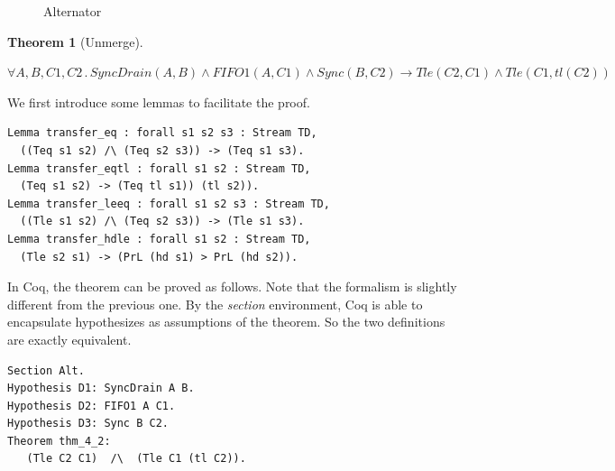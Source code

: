 \documentclass[preprint,3p]{elsarticle}
\newtheorem{theorem}{Theorem}[section]
\begin{document}
\begin{figure}
\vspace{0.5cm}
\centering
{}
\caption{Alternator}
\label{fig:alternator}
\end{figure}

\begin{theorem}[Unmerge]\label{the:alternator}

$\forall A,B,C1,C2\,.\,
SyncDrain(A,B)\land FIFO1(A,C1)\land Sync(B,C2)  \rightarrow Tle(C2,C1) \wedge Tle(C1, tl(C2))
$
\end{theorem}

We first introduce some lemmas to facilitate the proof.
\begin{lstlisting}[language=coq]
Lemma transfer_eq : forall s1 s2 s3 : Stream TD,
  ((Teq s1 s2) /\ (Teq s2 s3)) -> (Teq s1 s3).
Lemma transfer_eqtl : forall s1 s2 : Stream TD,
  (Teq s1 s2) -> (Teq tl s1)) (tl s2)).
Lemma transfer_leeq : forall s1 s2 s3 : Stream TD,
  ((Tle s1 s2) /\ (Teq s2 s3)) -> (Tle s1 s3).
Lemma transfer_hdle : forall s1 s2 : Stream TD,
  (Tle s2 s1) -> (PrL (hd s1) > PrL (hd s2)).
\end{lstlisting}

In Coq, the theorem can be proved as follows. Note that the formalism is slightly different from the previous one. By the \emph{section} environment, Coq is able to encapsulate hypothesizes as assumptions of the theorem. So the two definitions are exactly equivalent.

\begin{lstlisting}[language=coq]
Section Alt.
Hypothesis D1: SyncDrain A B.
Hypothesis D2: FIFO1 A C1.
Hypothesis D3: Sync B C2.
Theorem thm_4_2:
   (Tle C2 C1)  /\  (Tle C1 (tl C2)).
\end{lstlisting}
\end{document}
